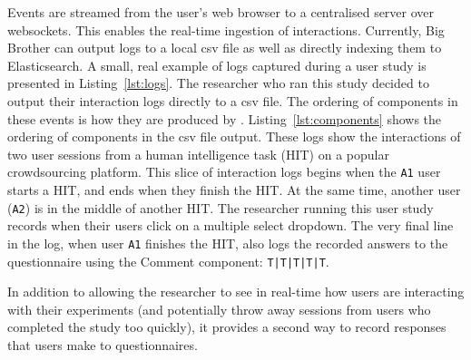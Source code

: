 Events are streamed from the user's web browser to a centralised server over websockets. This enables the real-time ingestion of interactions. Currently, Big Brother can output logs to a local csv file as well as directly indexing them to Elasticsearch. A small, real example of logs captured during a user study is presented in Listing~\ref{lst:logs}. The researcher who ran this study decided to output their interaction logs directly to a csv file. The ordering of components in these events is how they are produced by \bb. Listing~\ref{lst:components} shows the ordering of components in the csv file output. These logs show the interactions of two user sessions from a human intelligence task (HIT) on a popular crowdsourcing platform. This slice of interaction logs begins when the \texttt{A1} user starts a HIT, and ends when they finish the HIT. At the same time, another user (\texttt{A2}) is in the middle of another HIT. The researcher running this user study records when their users click on a multiple select dropdown. The very final line in the log, when user \texttt{A1} finishes the HIT, also logs the recorded answers to the questionnaire using the Comment component: \texttt{T|T|T|T|T}.

In addition to allowing the researcher to see in real-time how users are interacting with their experiments (and potentially throw away sessions from users who completed the study too quickly), it provides a second way to record responses that users make to questionnaires.

